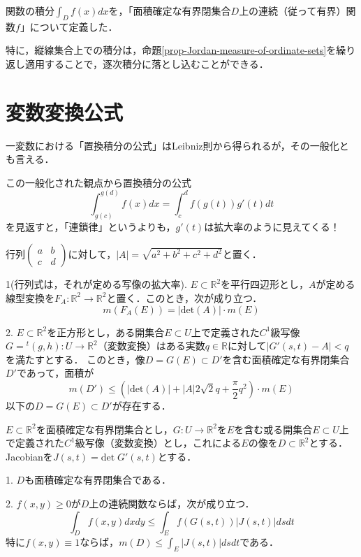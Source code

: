 \documentclass[uplatex, dvipdfmx]{jsreport}
\begin{document}
\begin{example}
    
\end{example}

\begin{screen}
    関数の積分$\int_Df(x)dx$を，「面積確定な有界閉集合$D$上の連続（従って有界）関数$f$」について定義した．

    特に，縦線集合上での積分は，命題\ref{prop-Jordan-measure-of-ordinate-sets}を繰り返し適用することで，逐次積分に落とし込むことができる．
\end{screen}

\section{変数変換公式}
一変数における「置換積分の公式」はLeibniz則から得られるが，その一般化とも言える．

この一般化された観点から置換積分の公式
\[ \int^{g(d)}_{g(c)}f(x)dx = \int^d_cf(g(t))g'(t)dt \]
を見返すと，「連鎖律」というよりも，$g'(t)$は拡大率のように見えてくる！

\begin{lemma}[面積の不等式]
    行列$\begin{pmatrix}a&b\\c&d\end{pmatrix}$に対して，$|A|=\sqrt{a^2+b^2+c^2+d^2}$と置く．

    1(行列式は，それが定める写像の拡大率). $E\subset\mathbb{R}^2$を平行四辺形とし，$A$が定める線型変換を$F_A:\mathbb{R}^2\to\mathbb{R}^2$と置く．このとき，次が成り立つ．
    \[ m(F_A(E))=|\mathrm{det}(A)|\cdot m(E) \]

    2. $E\subset\mathbb{R}^2$を正方形とし，ある開集合$E\subset U$上で定義された$C^1$級写像$G={}^t(g,h):U\to\mathbb{R}^2$（変数変換）はある実数$q\in\mathbb{R}$に対して$|G'(s,t)-A|<q$を満たすとする．
    このとき，像$D=G(E)\subset D'$を含む面積確定な有界閉集合$D'$であって，面積が
    \[ m(D')\le \left( |\mathrm{det}(A)|+|A|2\sqrt{2}q+\frac{\pi}{2}q^2 \right)\cdot m(E) \]
    以下の$D=G(E)\subset D'$が存在する．
\end{lemma}

\begin{proposition}[積分の不等式]
    $E\subset\mathbb{R}^2$を面積確定な有界閉集合とし，$G:U\to\mathbb{R}^2$を$E$を含む或る開集合$E\subset U$上で定義された$C^1$級写像（変数変換）とし，これによる$E$の像を$D\subset\mathbb{R}^2$とする．Jacobianを$J(s,t)=\mathrm{det}\;G'(s,t)$とする．

    1. $D$も面積確定な有界閉集合である．

    2. $f(x,y)\ge 0$が$D$上の連続関数ならば，次が成り立つ．
    \[ \int_Df(x,y)dxdy \le \int_E f(G(s,t))|J(s,t)|dsdt \]
    特に$f(x,y)\equiv 1$ならば，$m(D)\le\int_E|J(s,t)|dsdt$である．
\end{proposition}
\end{document}
